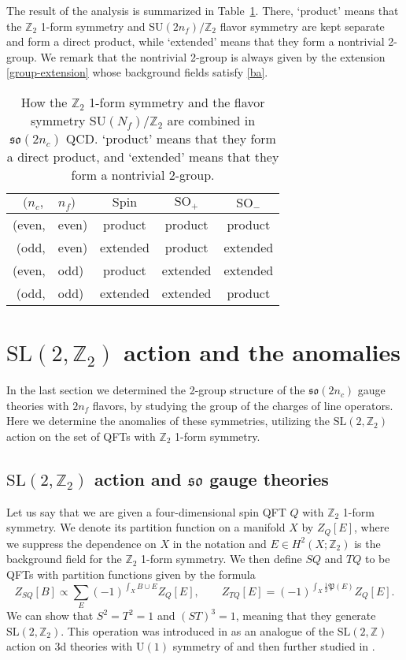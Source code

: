\documentclass[12pt]{article}
\numberwithin{equation}{section}
\def\bZ{\mathbb{Z}}
\def\fP{\mathfrak{P}}
\def\U{\mathrm{U}}
\def\SU{\mathrm{SU}}
\def\SO{\mathrm{SO}}
\def\so{\mathfrak{so}}
\def\Spin{\mathrm{Spin}}
\def\SL{\mathrm{SL}}
\begin{document}
The result of the analysis is summarized in Table~\ref{table:2group}.
There, `product' means that the $\bZ_2$ 1-form symmetry and $\SU(2n_f)/\bZ_2$ flavor symmetry are kept separate and form a direct product,
while `extended' means that they form a nontrivial 2-group.
We remark that the nontrivial 2-group is always given by the extension \eqref{group-extension}  whose background fields satisfy \eqref{ba}.

\begin{table}
\centering
\renewcommand{\arraystretch}{1.2}
\begin{tabular}{r@{\,}l|ccc}
$(n_c,$&$n_f)$ & $\Spin$ & $\SO_+$ & $\SO_-$\\
\hline
(even,&even) & product & product & product \\
(odd,&even) & extended & product & extended \\
(even,&odd) & product & extended & extended \\
(odd,&odd) & extended & extended & product
\end{tabular}
\caption{How the $\bZ_2$ 1-form symmetry and the flavor symmetry $\SU(N_f)/\bZ_2$ are combined
in $\so(2n_c)$ QCD.
`product' means that they form a direct product,
and `extended' means that they form a nontrivial 2-group.
\label{table:2group}}
\end{table}

\section{$\SL(2,\bZ_2)$ action and the anomalies}
\label{sec:sl2z}
In the last section we determined the 2-group structure of the $\so(2n_c)$ gauge theories with $2n_f$ flavors, by studying the group of the charges of line operators. 
Here we determine the anomalies of these symmetries, 
utilizing the $\SL(2,\bZ_2)$ action on the set of QFTs with $\bZ_2$ 1-form symmetry.

\subsection{$\SL(2,\bZ_2)$ action and $\so$ gauge theories}

Let us say that we are given a four-dimensional spin QFT $Q$ with $\bZ_2$ 1-form symmetry.
We denote its partition function on a manifold $X$ by $Z_Q[E]$, 
where we suppress the dependence on $X$ in the notation and $E\in H^2(X;\bZ_2)$ is the background field for the $\bZ_2$ 1-form symmetry.
We then define $SQ$ and $TQ$ to be QFTs with partition functions given by the formula \begin{equation}
Z_{SQ}[B] \propto \sum_{E} (-1)^{\int_X B\cup E} Z_Q[E],\qquad
Z_{TQ}[E]= (-1)^{\int_X \tfrac12 \fP(E)} Z_Q[E].
\end{equation}
We can show that $S^2=T^2=1$ and $(ST)^3=1$, meaning that they generate $\SL(2,\bZ_2)$.
This operation was introduced in  \cite{Gaiotto:2014kfa} as an analogue of the $\SL(2,\bZ)$ action on 3d theories with $\U(1)$ symmetry of  \cite{Witten:2003ya} and then further studied in \cite{Bhardwaj:2020ymp}.
\end{document}
